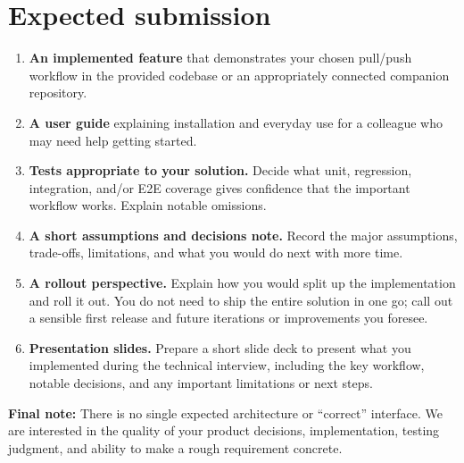 \documentclass[10pt,a4paper]{article}
\newcommand{\labeltext}[1]{\textcolor{accent}{\textbf{#1}}}
\newcommand{\callout}[1]{\noindent\colorbox{accentlight}{\parbox{\dimexpr\linewidth-2\fboxsep\relax}{\textcolor{ink}{#1}}}}
\begin{document}
\section{Expected submission}
\begin{enumerate}
  \item \textbf{An implemented feature} that demonstrates your chosen pull/push workflow in the provided codebase or an appropriately connected companion repository.
  \item \textbf{A user guide} explaining installation and everyday use for a colleague who may need help getting started.
  \item \textbf{Tests appropriate to your solution.} Decide what unit, regression, integration, and/or E2E coverage gives confidence that the important workflow works. Explain notable omissions.
  \item \textbf{A short assumptions and decisions note.} Record the major assumptions, trade-offs, limitations, and what you would do next with more time.
  \item \textbf{A rollout perspective.} Explain how you would split up the implementation and roll it out. You do not need to ship the entire solution in one go; call out a sensible first release and future iterations or improvements you foresee.
  \item \textbf{Presentation slides.} Prepare a short slide deck to present what you implemented during the technical interview, including the key workflow, notable decisions, and any important limitations or next steps.
\end{enumerate}

\vfill
\callout{\labeltext{Final note:} There is no single expected architecture or “correct” interface. We are interested in the quality of your product decisions, implementation, testing judgment, and ability to make a rough requirement concrete.}
\end{document}
